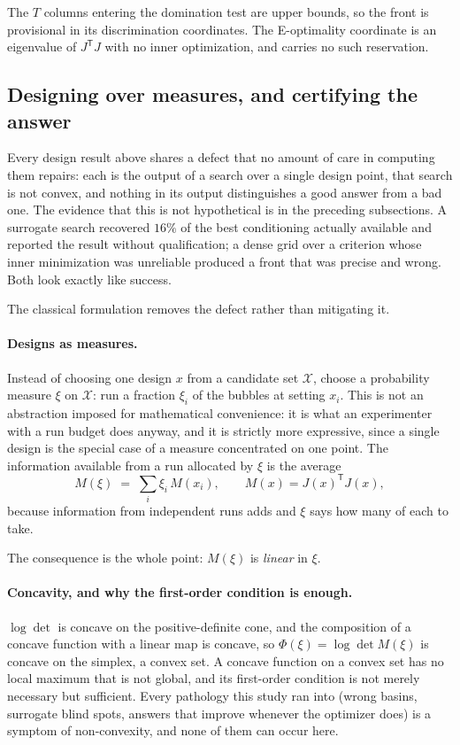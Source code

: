 \documentclass[10pt]{article}
\begin{document}
The $T$ columns entering the domination test are upper bounds, so the front is provisional in
its discrimination coordinates. The E-optimality coordinate is an eigenvalue of
$J^{\mathsf T}J$ with no inner optimization, and carries no such reservation.

\subsection*{Designing over measures, and certifying the answer}
\label{sec:measure}

Every design result above shares a defect that no amount of care in computing them repairs:
each is the output of a search over a single design point, that search is not convex, and
nothing in its output distinguishes a good answer from a bad one. The evidence that this is
not hypothetical is in the preceding subsections. A surrogate search recovered $16\%$ of the
best conditioning actually available and reported the result without qualification; a dense
grid over a criterion whose inner minimization was unreliable produced a front that was
precise and wrong. Both look exactly like success.

The classical formulation removes the defect rather than mitigating it.

\paragraph{Designs as measures.}
Instead of choosing one design $x$ from a candidate set $\mathcal{X}$, choose a probability
measure $\xi$ on $\mathcal{X}$: run a fraction $\xi_i$ of the bubbles at setting $x_i$. This
is not an abstraction imposed for mathematical convenience: it is what an experimenter
with a run budget does anyway, and it is strictly more expressive, since a single design is
the special case of a measure concentrated on one point. The information available from a
run allocated by $\xi$ is the average
%
\begin{equation}
M(\xi) \;=\; \sum_i \xi_i\, M(x_i),
\qquad
M(x) = J(x)^{\mathsf T}J(x),
\label{eq:measure-information}
\end{equation}
%
because information from independent runs adds and $\xi$ says how many of each to take.

The consequence is the whole point: $M(\xi)$ is \emph{linear} in $\xi$.

\paragraph{Concavity, and why the first-order condition is enough.}
$\log\det$ is concave on the positive-definite cone, and the composition of a concave
function with a linear map is concave, so $\Phi(\xi) = \log\det M(\xi)$ is concave on the
simplex, a convex set. A concave function on a convex set has no local maximum that is
not global, and its first-order condition is not merely necessary but sufficient. Every
pathology this study ran into (wrong basins, surrogate blind spots, answers that improve
whenever the optimizer does) is a symptom of non-convexity, and none of them can occur
here.
\end{document}
